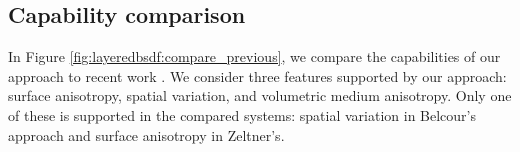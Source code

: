 \subsection{Capability comparison}

In Figure \ref{fig:layeredbsdf:compare_previous}, we compare the capabilities of our approach to recent work \cite{zeltner2018layer,belcour2018efficient}. We consider three features supported by our approach: surface anisotropy, spatial variation, and volumetric medium anisotropy. Only one of these is supported in the compared systems: spatial variation in Belcour's approach and surface anisotropy in Zeltner's.

